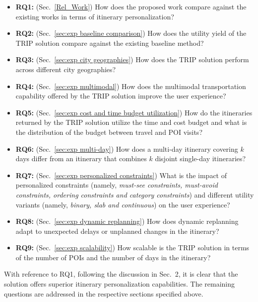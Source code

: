 \begin{itemize}

    \item \textbf{RQ1:} (Sec.~\ref{Rel_Work}) How does the proposed work compare against the existing works in terms of itinerary personalization?

    \item \textbf{RQ2:} (Sec.~\ref{sec:exp baseline comparison}) How does the utility yield of the TRIP solution compare against the existing baseline method?

    \item \textbf{RQ3:} (Sec.~\ref{sec:exp city geographies}) How does the TRIP solution perform across different city geographies?

    \item \textbf{RQ4:} (Sec.~\ref{sec:exp multimodal}) How does the multimodal transportation capability offered by the TRIP solution improve the user experience?

    \item \textbf{RQ5:} (Sec.~\ref{sec:exp cost and time budget utilization}) How do the itineraries returned by the TRIP solution utilize the time and cost budget and what is the distribution of the budget between travel and POI visits?

    \item \textbf{RQ6:} (Sec.~\ref{sec:exp multi-day}) How does a multi-day itinerary covering $k$ days differ from an itinerary that combines $k$ disjoint single-day itineraries?

    \item \textbf{RQ7:} (Sec.~\ref{sec:exp personalized constraints}) What is the impact of personalized constraints (namely, \textit{must-see constraints, must-avoid constraints, ordering constraints and category constraints}) and different utility variants (namely, \textit{binary, slab and continuous}) on the user experience?

    \item \textbf{RQ8:} (Sec.~\ref{sec:exp dynamic replanning}) How does dynamic replanning adapt to unexpected delays or unplanned changes in the itinerary?

    \item \textbf{RQ9:} (Sec.~\ref{sec:exp scalability}) How scalable is the TRIP solution in terms of the number of POIs and the number of days in the itinerary?

\end{itemize}

With reference to RQ1, following the discussion in Sec.~2, it is clear that the \trip solution offers superior itinerary personalization capabilities. The remaining questions are addressed in the respective sections specified above.
